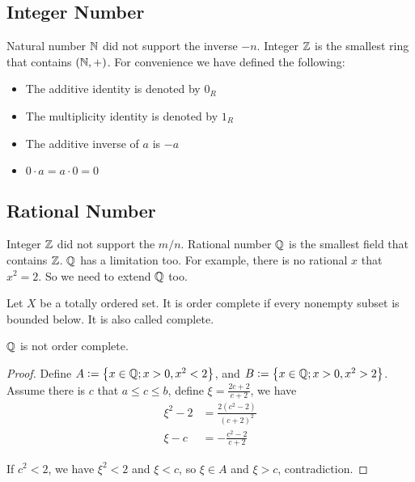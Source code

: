 \subsection{Integer Number}
Natural number $\mathbb{N}$ did not support the inverse $-n$. Integer $\mathbb{Z}$ is the smallest ring that contains $(\mathbb{N}, +)$. For convenience we have defined the following:
\begin{itemize}
    \item The additive identity is denoted by $0_R$
    \item The multiplicity identity is denoted by $1_R$
    \item The additive inverse of $a$ is $-a$
    \item $0 \cdot a = a \cdot 0 = 0$
\end{itemize}

\subsection{Rational Number}
Integer $\mathbb{Z}$ did not support the $m/n$. Rational number $\mathbb{Q}$ is the smallest field that contains $\mathbb{Z}$. $\mathbb{Q}$ has a limitation too. For example, there is no rational $x$ that $x^2 = 2$. So we need to extend $\mathbb{Q}$ too.

\begin{definition}
    Let $X$ be a totally ordered set. It is order complete if every nonempty subset is bounded below. It is also called complete.
\end{definition}


\begin{theorem}
    $\mathbb{Q}$ is not order complete.
\end{theorem}
\begin{proof}
    Define $A:=\set{x \in \mathbb{Q}; x > 0 , x^2 < 2}$, and $B:=\set{x \in \mathbb{Q}; x > 0, x^2 > 2}$. Assume there is $c$ that $a \leq c \leq b$, define $\xi = \frac{2c+2}{c+2}$, we have
    \begin{equation}
        \begin{aligned}
            \xi^2 - 2 &= \frac{2(c^2 -2)}{(c+2)^2} \\
            \xi - c &= - \frac{c^2 -2}{c+2}    
        \end{aligned}      
    \end{equation}
    
    If $c^2 < 2$, we have $\xi^2 < 2$ and $\xi < c$, so $\xi \in A$ and $\xi > c$, contradiction.
\end{proof}


